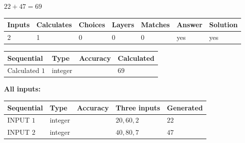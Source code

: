 \documentclass[12pt]{article}
\begin{document}
 

 
 
 
\noindent{}
 
 

$ %
22 +  %
47=   %
69$
 
 
\noindent{}
 
 

 
   
   
   
   
\noindent\begin{tabular}{|l|l|l|l|l|l|l|}
 \hline
Inputs & Calculates & Choices & Layers & Matches & Answer & Solution \\ \hline
 2  & 
 1  & 
 0
  & 
 0  & 
 0  & 
  yes & 
  yes 
  \\ \hline
 \end{tabular}
   
   
   
   
\noindent{}
   
   
  
  
\noindent\begin{tabular}{|l|l|l|l|}
\hline
 Sequential & Type & Accuracy & Calculated \\ 
\hline
 
 
  Calculated $  1 $ & integer &  & 
  $ 69 $ 
 \\  \hline  
 \end{tabular}
   
   
   
   
\noindent\vspace{0.1in}\hspace{-0.08in} {\textbf{\Large{All inputs: }}}
   
   
  
  
\noindent\begin{tabular}{|l|l|l|l|l|}
\hline
 Sequential & Type & Accuracy & Three inputs & Generated \\ 
\hline
 
 
  INPUT $  1 $ & integer &  & $
 20
 , 
 60
 , 
 2
 $ & $ 22 $ 
 \\  \hline  
 
 
  INPUT $  2 $ & integer &  & $
 40
 , 
 80
 , 
 7
 $ & $ 47 $ 
 \\  \hline  
 \end{tabular}
   
\end{document}
